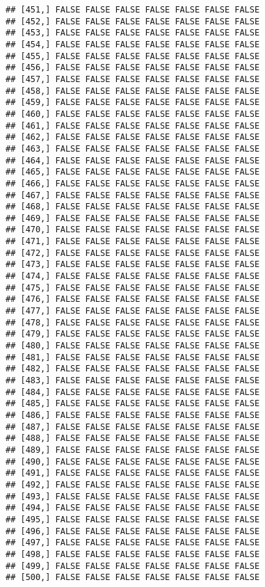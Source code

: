 \documentclass[
]{article}
\begin{document}
\begin{verbatim}
## [451,] FALSE FALSE FALSE FALSE FALSE FALSE FALSE
## [452,] FALSE FALSE FALSE FALSE FALSE FALSE FALSE
## [453,] FALSE FALSE FALSE FALSE FALSE FALSE FALSE
## [454,] FALSE FALSE FALSE FALSE FALSE FALSE FALSE
## [455,] FALSE FALSE FALSE FALSE FALSE FALSE FALSE
## [456,] FALSE FALSE FALSE FALSE FALSE FALSE FALSE
## [457,] FALSE FALSE FALSE FALSE FALSE FALSE FALSE
## [458,] FALSE FALSE FALSE FALSE FALSE FALSE FALSE
## [459,] FALSE FALSE FALSE FALSE FALSE FALSE FALSE
## [460,] FALSE FALSE FALSE FALSE FALSE FALSE FALSE
## [461,] FALSE FALSE FALSE FALSE FALSE FALSE FALSE
## [462,] FALSE FALSE FALSE FALSE FALSE FALSE FALSE
## [463,] FALSE FALSE FALSE FALSE FALSE FALSE FALSE
## [464,] FALSE FALSE FALSE FALSE FALSE FALSE FALSE
## [465,] FALSE FALSE FALSE FALSE FALSE FALSE FALSE
## [466,] FALSE FALSE FALSE FALSE FALSE FALSE FALSE
## [467,] FALSE FALSE FALSE FALSE FALSE FALSE FALSE
## [468,] FALSE FALSE FALSE FALSE FALSE FALSE FALSE
## [469,] FALSE FALSE FALSE FALSE FALSE FALSE FALSE
## [470,] FALSE FALSE FALSE FALSE FALSE FALSE FALSE
## [471,] FALSE FALSE FALSE FALSE FALSE FALSE FALSE
## [472,] FALSE FALSE FALSE FALSE FALSE FALSE FALSE
## [473,] FALSE FALSE FALSE FALSE FALSE FALSE FALSE
## [474,] FALSE FALSE FALSE FALSE FALSE FALSE FALSE
## [475,] FALSE FALSE FALSE FALSE FALSE FALSE FALSE
## [476,] FALSE FALSE FALSE FALSE FALSE FALSE FALSE
## [477,] FALSE FALSE FALSE FALSE FALSE FALSE FALSE
## [478,] FALSE FALSE FALSE FALSE FALSE FALSE FALSE
## [479,] FALSE FALSE FALSE FALSE FALSE FALSE FALSE
## [480,] FALSE FALSE FALSE FALSE FALSE FALSE FALSE
## [481,] FALSE FALSE FALSE FALSE FALSE FALSE FALSE
## [482,] FALSE FALSE FALSE FALSE FALSE FALSE FALSE
## [483,] FALSE FALSE FALSE FALSE FALSE FALSE FALSE
## [484,] FALSE FALSE FALSE FALSE FALSE FALSE FALSE
## [485,] FALSE FALSE FALSE FALSE FALSE FALSE FALSE
## [486,] FALSE FALSE FALSE FALSE FALSE FALSE FALSE
## [487,] FALSE FALSE FALSE FALSE FALSE FALSE FALSE
## [488,] FALSE FALSE FALSE FALSE FALSE FALSE FALSE
## [489,] FALSE FALSE FALSE FALSE FALSE FALSE FALSE
## [490,] FALSE FALSE FALSE FALSE FALSE FALSE FALSE
## [491,] FALSE FALSE FALSE FALSE FALSE FALSE FALSE
## [492,] FALSE FALSE FALSE FALSE FALSE FALSE FALSE
## [493,] FALSE FALSE FALSE FALSE FALSE FALSE FALSE
## [494,] FALSE FALSE FALSE FALSE FALSE FALSE FALSE
## [495,] FALSE FALSE FALSE FALSE FALSE FALSE FALSE
## [496,] FALSE FALSE FALSE FALSE FALSE FALSE FALSE
## [497,] FALSE FALSE FALSE FALSE FALSE FALSE FALSE
## [498,] FALSE FALSE FALSE FALSE FALSE FALSE FALSE
## [499,] FALSE FALSE FALSE FALSE FALSE FALSE FALSE
## [500,] FALSE FALSE FALSE FALSE FALSE FALSE FALSE

\end{verbatim}
\end{document}
